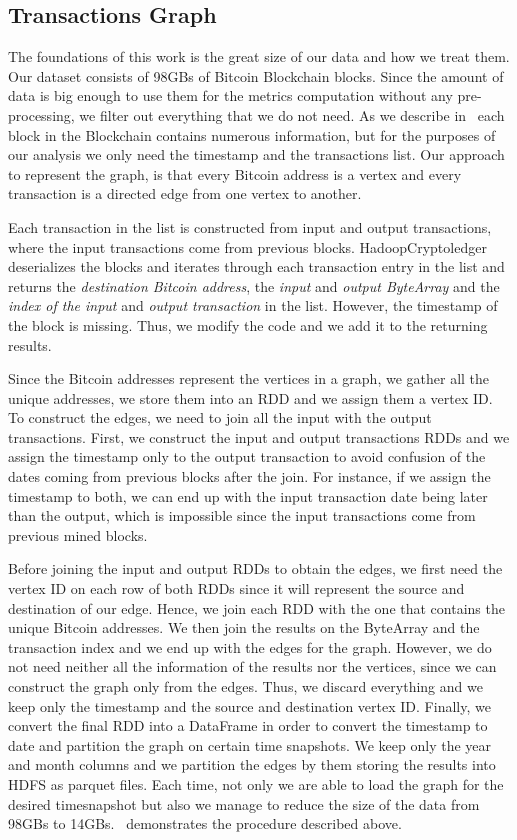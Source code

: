 \subsection{Transactions Graph}
The foundations of this work is the great size of our data and how we treat them. Our dataset consists of 98GBs of Bitcoin Blockchain blocks. Since the amount of data is big enough to use them for the metrics computation without any pre-processing, we filter out everything that we do not need. As we describe in~ each block in the Blockchain contains numerous information, but for the purposes of our analysis we only need the timestamp and the transactions list. Our approach to represent the graph, is that every Bitcoin address is a vertex and every transaction is a directed edge from one vertex to another.

Each transaction in the list is constructed from input and output transactions,
where the input transactions come from previous blocks. HadoopCryptoledger
deserializes the blocks and iterates through each transaction entry in the list
and returns the \textit{destination Bitcoin address}, the \textit{input} and \textit{output ByteArray} and the \textit{index of the input} and 
\textit{output transaction} in the list. However, the timestamp of the block is missing. Thus, we modify the
code and we add it to the returning results. 

Since the Bitcoin addresses represent the vertices in a graph, we gather all
the unique addresses, we store them into an RDD and we assign them a vertex ID.
To construct the edges, we need to join all the input with the output
transactions. First, we construct the input and output transactions RDDs and we assign the timestamp
only to the output transaction to avoid confusion of the dates coming from
previous blocks after the join. For instance, if we assign the timestamp to
both, we can end up with the input transaction date being later than the
output, which is impossible since the input transactions come from previous
mined blocks.

Before joining the input and output RDDs to obtain the edges, we first need the
vertex ID on each row of both RDDs since it will represent the source and
destination of our edge. Hence, we join each RDD with the one that contains the
unique Bitcoin addresses. We then join the results on
the ByteArray and the transaction index and we end up with the edges for the
graph. However, we do not need neither all the information of the results nor
the vertices, since we can construct the graph only from the edges. Thus, we
discard everything and we keep only the timestamp and the source and
destination vertex ID. Finally, we convert the final RDD into a DataFrame in
order to convert the timestamp to date and partition the graph on certain time
snapshots. We keep only the year and month columns and we partition the edges
by them storing the results into HDFS as parquet files. Each time, not only we
are able to load the graph for the desired timesnapshot but also we manage to
reduce the size of the data from 98GBs to 14GBs.~ demonstrates
the procedure described above.


